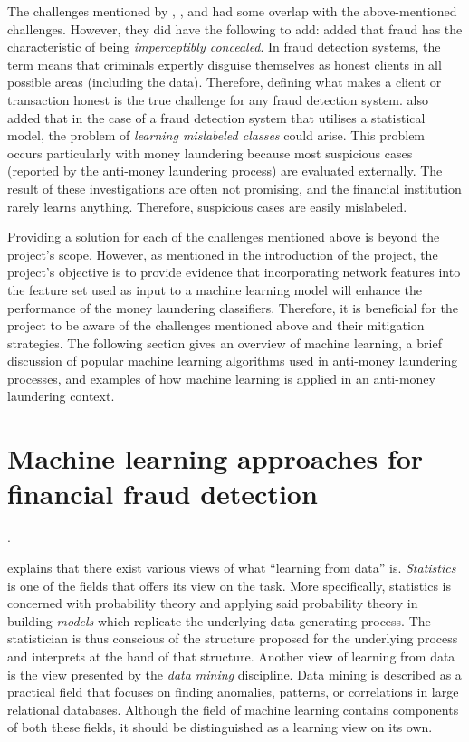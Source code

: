 The challenges mentioned by \citet*{van2017gotcha}, \citet{sudjianto2010statistical}, and \citet{gao2007framework} had some overlap with the above-mentioned challenges. However, they did have the following to add: \citet{van2017gotcha} added that fraud has the characteristic of being \textit{imperceptibly concealed}. In fraud detection systems, the term means that criminals expertly disguise themselves as honest clients in all possible areas (including the data). Therefore, defining what makes a client or transaction honest is the true challenge for any fraud detection system. \citet{sudjianto2010statistical} also added that in the case of a fraud detection system that utilises a statistical model, the problem of \textit{learning mislabeled classes} could arise. This problem occurs particularly with money laundering because most suspicious cases (reported by the anti-money laundering process) are evaluated externally. The result of these investigations are often not promising, and the financial institution rarely learns anything. Therefore, suspicious cases are easily mislabeled.

Providing a solution for each of the challenges mentioned above is beyond the project's scope. However, as mentioned in the introduction of the project, the project's objective is to provide evidence that incorporating network features into the feature set used as input to a machine learning model will enhance the performance of the  money laundering classifiers. Therefore, it is beneficial for the project to be aware of the challenges mentioned above and their mitigation strategies. The following section gives an overview of machine learning, a brief discussion of popular machine learning algorithms used in anti-money laundering processes, and examples of how machine learning is applied in an anti-money laundering context.  

\section{Machine learning approaches for financial fraud detection}.

\citet{abu2012learning} explains that there exist various views of what ``learning from data'' is. \textit{Statistics} is one of the fields that offers its view on the task. More specifically, statistics is concerned with probability theory and applying said probability theory in building \textit{models} which replicate the underlying data generating process. The statistician is thus conscious of the structure proposed for the underlying process and interprets at the hand of that structure. Another view of learning from data is the view presented by the \textit{data mining} discipline. Data mining is described as a practical field that focuses on finding anomalies, patterns, or correlations in large relational databases. Although the field of machine learning contains components of both these fields, it should be distinguished as a learning view on its own.
 

